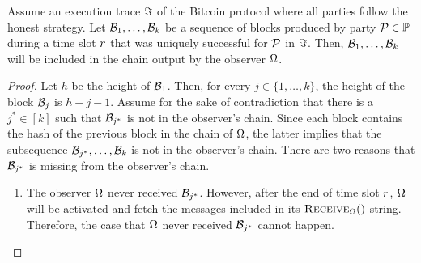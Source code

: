 \begin{lemma}\label{lem:unique_succ}
    Assume an execution trace $\Im$ of the Bitcoin protocol where
    all parties follow the honest strategy. Let $\mathcal{B}_1,\ldots,\mathcal{B}_k$ be a
    sequence of blocks produced by party $\mathcal{P}\in\mathbb{P}$ during a time
    slot $r$ that was uniquely successful for $\mathcal{P}$ in
    $\Im$. Then, $\mathcal{B}_1,\ldots,\mathcal{B}_k$ will be included in the
    chain output by the observer $\Omega$.
\end{lemma}
\begin{proof}
    Let $h$ be the height of $\mathcal{B}_1$. Then, for every $j\in\{1,\ldots,k\}$,
    the height of the block $\mathcal{B}_j$ is $h+j-1$.  Assume for the sake of
    contradiction that there is a $j^*\in[k]$ such that $\mathcal{B}_{j^*}$ is not
    in the observer's chain. Since each block contains the hash of the previous
    block in the chain of $\Omega$, the latter implies that the subsequence
    $\mathcal{B}_{j^*},\ldots,\mathcal{B}_k$ is not in the observer's chain. There are
    two reasons that $\mathcal{B}_{j^*}$ is missing from the observer's chain.
    \begin{enumerate}
    \item The observer $\Omega$ never received $\mathcal{B}_{j^*}$. However,
        after the end of time slot $r$, $\Omega$ will be activated and
            fetch the messages included in its $\textsc{Receive}_\Omega()$
            string. Therefore, the case that $\Omega$ never received
            $\mathcal{B}_{j^*}$ cannot happen.


\end{enumerate}
\end{proof}
